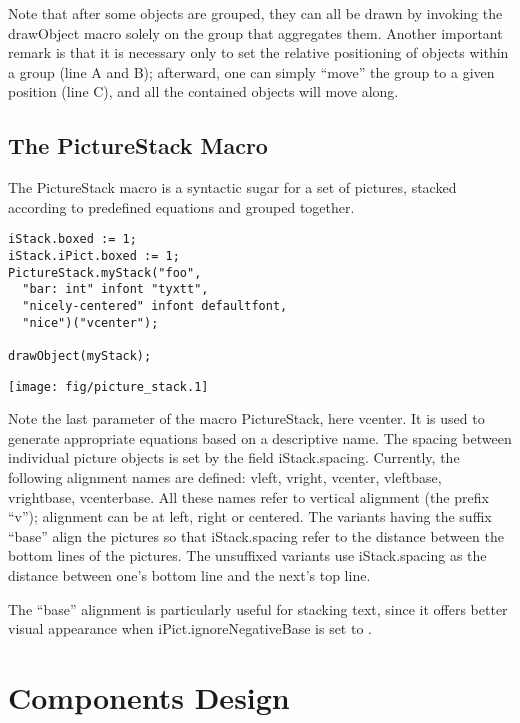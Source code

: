 \documentclass{article}
\newcommand{\code}{\ttfamily}
\begin{document}
Note that after some objects are grouped, they can all be drawn
by invoking the {\code drawObject} macro solely on the group that aggregates them.
Another important remark is that it is necessary only to set the relative
positioning of objects within a group (line A and B); afterward, one can
simply ``move'' the group to a given position (line C), and all the contained
objects will move along.

\subsection{The PictureStack Macro}

The {\code PictureStack} macro is a syntactic sugar for a set of pictures,
stacked according to predefined equations and grouped together.

\begin{multicols}{2}
\begin{verbatim}
iStack.boxed := 1;
iStack.iPict.boxed := 1;
PictureStack.myStack("foo",
  "bar: int" infont "tyxtt",
  "nicely-centered" infont defaultfont,
  "nice")("vcenter");

drawObject(myStack);
\end{verbatim}
\columnbreak
\hspace{1cm}\texttt{[image: fig/picture\_stack.1]}
\end{multicols}

Note the last parameter of the macro {\code PictureStack}, here {\code vcenter}.
It is used to generate appropriate equations based on a descriptive name.
The spacing between individual picture objects is set by the field
{\code iStack.spacing}. Currently, the following alignment names are
defined: {\code vleft}, {\code vright}, {\code vcenter},
{\code vleftbase}, {\code vrightbase}, {\code vcenterbase}. All these
names refer to vertical alignment (the prefix ``{\code v}''); alignment can
be at left, right or centered. The variants having the suffix ``{\code base}'' align
the pictures so that {\code iStack.spacing} refer to the distance between the
bottom lines of the pictures. The unsuffixed variants use {\code iStack.spacing} as
the distance between one's bottom line and the next's top line.

The ``{\code base}'' alignment is particularly useful for stacking text, since it
offers better visual appearance when {\code iPict.ignoreNegativeBase} is set to {\code 1}.

\section{Components Design}
\end{document}
